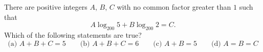 There are positive integers $A$, $B$, $C$ with no common factor greater than $1$ such that
\[
A\log_{200}5+B\log_{200}2=C .
\]
Which of the following statements are true?
\[
\text{(a) } A+B+C=5\qquad\text{(b) } A+B+C=6\qquad\text{(c) } A+B=5\qquad\text{(d) } A=B=C
\]

